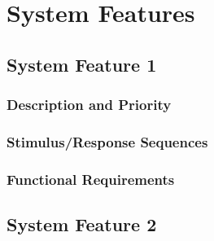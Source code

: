 \chapter{System Features}
\section{System Feature 1}

\subsection{Description and Priority}

\subsection{Stimulus/Response Sequences}

\subsection{Functional Requirements}

\section{System Feature 2}
